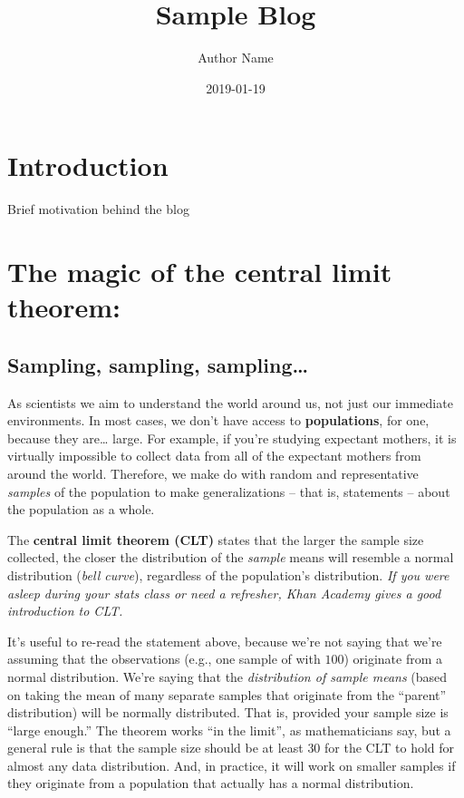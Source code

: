 \documentclass[]{book}
\title{Sample Blog}
\author{Author Name}
\date{2019-01-19}
\begin{document}
\maketitle

{
\setcounter{tocdepth}{1}
\tableofcontents
}
\chapter{Introduction}\label{introduction}

Brief motivation behind the blog

\chapter{The magic of the central limit
theorem:}\label{the-magic-of-the-central-limit-theorem}

\section{Sampling, sampling,
sampling\ldots{}}\label{sampling-sampling-sampling}

As scientists we aim to understand the world around us, not just our
immediate environments. In most cases, we don't have access to
\textbf{populations}, for one, because they are\ldots{} large. For
example, if you're studying expectant mothers, it is virtually
impossible to collect data from all of the expectant mothers from around
the world. Therefore, we make do with random and representative
\emph{samples} of the population to make generalizations -- that is,
statements -- about the population as a whole.

The \textbf{central limit theorem (CLT)} states that the larger the
sample size collected, the closer the distribution of the \emph{sample}
means will resemble a normal distribution (\emph{bell curve}),
regardless of the population's distribution. \emph{If you were asleep
during your stats class or need a refresher, Khan Academy gives a good
introduction to CLT.}

It's useful to re-read the statement above, because we're not saying
that we're assuming that the observations (e.g., one sample of with
\(100\)) originate from a normal distribution. We're saying that the
\emph{distribution of sample means} (based on taking the mean of many
separate samples that originate from the ``parent'' distribution) will
be normally distributed. That is, provided your sample size is ``large
enough.'' The theorem works ``in the limit'', as mathematicians say, but
a general rule is that the sample size should be at least \(30\) for the
CLT to hold for almost any data distribution. And, in practice, it will
work on smaller samples if they originate from a population that
actually has a normal distribution.
\end{document}
